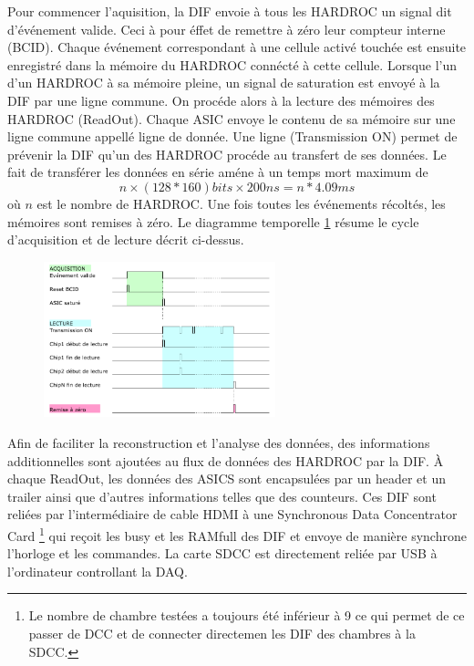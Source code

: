 Pour commencer l'aquisition, la DIF envoie à tous les HARDROC un signal dit d'événement valide. Ceci à pour éffet de remettre à zéro leur compteur interne (BCID). Chaque événement correspondant à une cellule activé touchée est ensuite enregistré dans la mémoire du HARDROC connécté à cette cellule. Lorsque l'un d'un HARDROC à sa mémoire pleine, un signal de saturation est envoyé à la DIF par une ligne commune. On procéde alors à la lecture des mémoires des HARDROC (ReadOut). Chaque ASIC envoye le contenu de sa mémoire sur une ligne commune appellé ligne de donnée. Une ligne (Transmission ON) permet de prévenir la DIF qu'un des HARDROC procéde au transfert de ses données. Le fait de transférer les données en série améne à un temps mort maximum de
\begin{equation}
n\times(128*160)bits\times 200ns= n*4.09ms
\end{equation} 
où $n$ est le nombre de HARDROC. Une fois toutes les événements récoltés, les mémoires sont remises à zéro. Le diagramme temporelle \ref{temp} résume le cycle d'acquisition et de lecture décrit ci-dessus.

\begin{figure}[ht!]
	\centering
	\includegraphics[width=0.6\textwidth]{GLA/cycle.png}
	\label{temp}
\end{figure}
Afin de faciliter la reconstruction et l'analyse des données, des informations additionnelles sont ajoutées au flux de données des HARDROC par la DIF. À chaque ReadOut, les données des ASICS sont encapsulées par un header et un trailer ainsi que d'autres informations telles que des counteurs. Ces DIF sont reliées par l'intermédiaire de cable HDMI à une Synchronous Data Concentrator Card \footnote{Le nombre de chambre testées a toujours été inférieur à 9 ce qui permet de ce passer de DCC et de connecter directemen les DIF des chambres à la SDCC.} \cite{Baulieu:2015pfa} qui reçoit les busy et les RAMfull des DIF et envoye de manière synchrone l'horloge et les commandes. La carte SDCC est directement reliée par USB à l'ordinateur controllant la DAQ.

